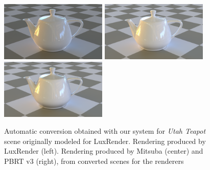 \begin{figure}
\centering
\includegraphics[width=2in]{figs/4_results/teapot/1_from_lux.png}
\includegraphics[width=2in]{figs/4_results/teapot/2_to_mitsuba.png}
\includegraphics[width=2in]{figs/4_results/teapot/3_to_pbrt.png}
\caption{Automatic conversion obtained with our system for \textit{Utah Teapot}
scene originally modeled for LuxRender. Rendering produced by LuxRender (left).
Rendering produced by Mitsuba (center) and PBRT v3 (right),
from converted scenes for the renderers}
\label{fig:teapot}
\end{figure}

